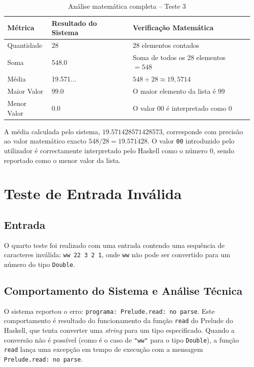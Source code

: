 \documentclass[12pt, a4paper, oneside]{report}
\begin{document}
\begin{table}[H]
\centering
\caption{Análise matemática completa -- Teste 3}
\label{tab:teste3}
\begin{tabular}{lll}
\toprule
Métrica & Resultado do Sistema & Verificação Matemática \\
\midrule
Quantidade & 28 & 28 elementos contados \\
Soma & 548.0 & Soma de todos os 28 elementos $= 548$ \\
Média & 19.571... & $548 \div 28 \approx 19{,}5714$ \\
Maior Valor & 99.0 & O maior elemento da lista é 99 \\
Menor Valor & 0.0 & O valor 00 é interpretado como 0 \\
\bottomrule
\end{tabular}
\end{table}

A média calculada pelo sistema, $19.571428571428573$, corresponde com precisão ao valor matemático exacto $548/28 = 19.\overline{571428}$. O valor \texttt{00} introduzido pelo utilizador é correctamente interpretado pelo Haskell como o número $0$, sendo reportado como o menor valor da lista.

\section{Teste de Entrada Inválida}

\subsection{Entrada}

O quarto teste foi realizado com uma entrada contendo uma sequência de caracteres inválida: \texttt{ww 22 3 2 1}, onde \texttt{ww} não pode ser convertido para um número do tipo \texttt{Double}.

\subsection{Comportamento do Sistema e Análise Técnica}

O sistema reportou o erro: \texttt{programa: Prelude.read: no parse}. Este comportamento é resultado do funcionamento da função \texttt{read} do Prelude do Haskell, que tenta converter uma \textit{string} para um tipo especificado. Quando a conversão não é possível (como é o caso de \texttt{"ww"} para o tipo \texttt{Double}), a função \texttt{read} lança uma excepção em tempo de execução com a mensagem \texttt{Prelude.read: no parse}.
\end{document}
